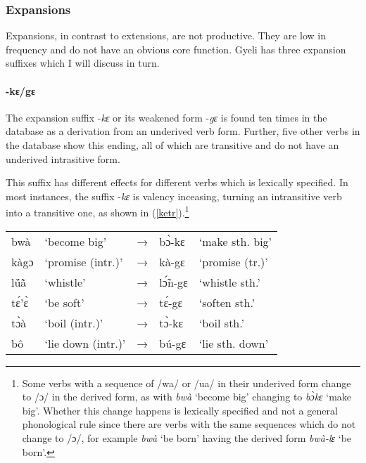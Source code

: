 \subsubsection{Expansions}
\label{sec:DiaEx} 

Expansions, in contrast to extensions, are not productive. They are low in frequency and do not have an obvious core function. Gyeli has three expansion suffixes which I will discuss in turn.

\paragraph{{\bfseries -kɛ/gɛ}}

The expansion suffix -{\itshape kɛ} or its weakened form -{\itshape gɛ} is found ten times in the database as a derivation from an underived verb form. Further, five other verbs in the database show this ending, all of which are transitive and do not have an underived intrasitive form.

This suffix has different effects for different verbs which is lexically specified. In most instances, the suffix -{\itshape kɛ} is valency inceasing, turning an intransitive verb into a transitive one, as shown in (\ref{ketr}).\footnote{Some verbs with a sequence of /wa/ or /ua/ in their underived form change to /ɔ/ in the derived form, as with {\itshape bwà} `become big' changing to {\itshape bɔ̀kɛ} `make big'. Whether this change happens is lexically specified and not a general phonological rule since there are verbs with the same sequences which do not change to /ɔ/, for example {\itshape bwà} `be born' having the derived form {\itshape bwà-lɛ} `be born'.} %


\begin{exe} \ex \label{ketr}
\begin{tabular}{llllp{4cm}}
bwà & `become big' & → & bɔ̀-kɛ & `make sth. big' \\
kàgɔ & `promise (intr.)' & → & kà-gɛ & `promise (tr.)' \\
lṹã̀ & `whistle' & → & lɔ̃́n-gɛ & `whistle sth.' \\
tɛ́'ɛ̀ & `be soft' & → & tɛ́-gɛ & `soften sth.' \\
tɔ̀à & `boil (intr.)' & → & tɔ̀-kɛ & `boil sth.' \\
bô & `lie down (intr.)' & → & bú-gɛ & `lie sth. down' \\
\end{tabular}
\end{exe}


